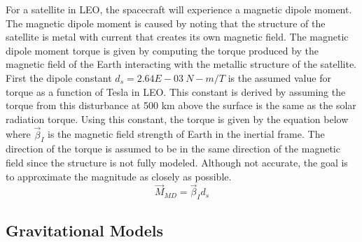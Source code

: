 For a satellite in LEO, the spacecraft will experience a magnetic
dipole moment. The magnetic dipole moment is caused by noting that the
structure of the satellite is metal with current that creates its own
magnetic field. The magnetic dipole moment torque is given by
computing the torque produced by the magnetic field of the Earth
interacting with the metallic structure of the satellite. First the
dipole constant $d_s=2.64E-03~N-m/T$ is the assumed value for torque
as a function of Tesla in LEO. This constant is derived by assuming
the torque from this disturbance at 500 km above the surface is the
same as the solar radiation torque. Using this constant, the torque is
given by the equation below where $\vec{\beta}_I$ is the magnetic
field strength of Earth in the inertial frame. The direction of the
torque is assumed to be in the same direction of the magnetic field
since the structure is not fully modeled. Although not accurate, the
goal is to approximate the magnitude as closely as possible.  
\begin{equation}
    \vec{M}_{MD}=\vec{\beta}_I d_s
\end{equation}

\subsection{Gravitational Models}

